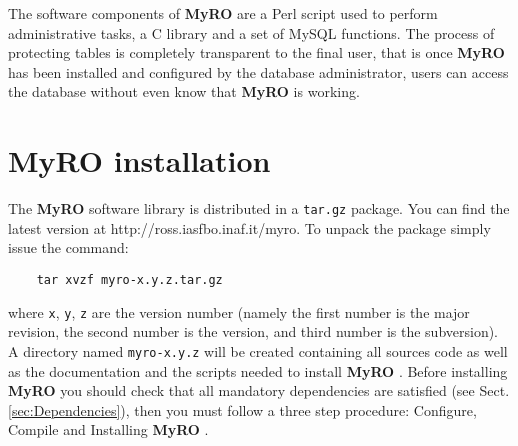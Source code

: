\documentclass[12pt,titlepage]{article}
\newcommand{\myro}{\textbf{MyRO} }
\def\url{http://ross.iasfbo.inaf.it/myro}
\begin{document}
\smallskip
The software components of \myro are a Perl script used to perform
administrative tasks, a C library and a set of MySQL functions. The
process of protecting tables is completely transparent to the final
user, that is once \myro has been installed and configured by the
database administrator, users can access the database without even
know that \myro is working.
%
%



\newpage
\section{\myro installation}

The \myro software library is distributed in a \verb|tar.gz| package.
You can find the latest version at \url. To unpack the package simply
issue the command:
%
\begin{verbatim}
    tar xvzf myro-x.y.z.tar.gz
\end{verbatim}
%
where \verb|x|, \verb|y|, \verb|z| are the version number (namely the
first number is the major revision, the second number is the version,
and third number is the subversion). A directory named
\verb|myro-x.y.z| will be created containing all sources code as well
as the documentation and the scripts needed to install \myro. Before
installing \myro you should check that all mandatory dependencies are
satisfied (see Sect. \ref{sec:Dependencies}), then you must follow a
three step procedure: Configure, Compile and Installing \myro.
\end{document}
